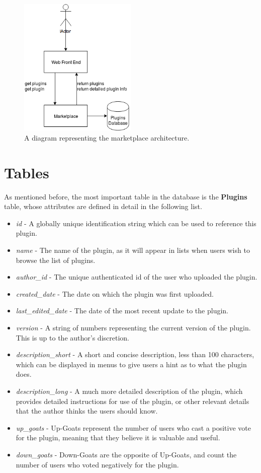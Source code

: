 \documentclass[a4paper, 12pt]{article}
\begin{document}
		\begin{figure}[H]
			\caption{A diagram representing the marketplace architecture.}
			\centering
				\includegraphics[width=0.5\textwidth]{img/MarketplaceArchitecture.png}
		\end{figure}

	\section{Tables}
		As mentioned before, the most important table in the database is the \textbf{Plugins} table, whose attributes are defined in detail in the following list.

		\begin{itemize}
			\item \emph{id} - A globally unique identification string which can be used to reference this plugin.
			\item \emph{name} - The name of the plugin, as it will appear in lists when users wish to browse the list of plugins.
			\item \emph{author\_id} - The unique authenticated id of the user who uploaded the plugin.
			\item \emph{created\_date} - The date on which the plugin was first uploaded.
			\item \emph{last\_edited\_date} - The date of the most recent update to the plugin.
			\item \emph{version} - A string of numbers representing the current version of the plugin. This is up to the author's discretion.
			\item \emph{description\_short} - A short and concise description, less than 100 characters, which can be displayed in menus to give users a hint as to what the plugin does.
			\item \emph{description\_long} - A much more detailed description of the plugin, which provides detailed instructions for use of the plugin, or other relevant details that the author thinks the users should know.
			\item \emph{up\_goats} - Up-Goats represent the number of users who cast a positive vote for the plugin, meaning that they believe it is valuable and useful.
			\item \emph{down\_goats} - Down-Goats are the opposite of Up-Goats, and count the number of users who voted negatively for the plugin.
		\end{itemize}
\end{document}
